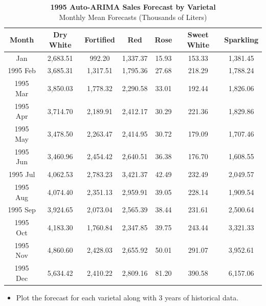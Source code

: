 \documentclass[
  letterpaper,
  DIV=11,
  numbers=noendperiod]{scrartcl}
\providecommand{\tightlist}{%
  \setlength{\itemsep}{0pt}\setlength{\parskip}{0pt}}
\begin{document}
\begin{table}
\caption*{
{\fontsize{20}{25}\selectfont  \textbf{1995 Auto-ARIMA Sales Forecast by Varietal}\fontsize{12}{15}\selectfont } \\ 
{\fontsize{14}{17}\selectfont  Monthly Mean Forecasts (Thousands of Liters)\fontsize{12}{15}\selectfont }
} 
\fontsize{12.0pt}{14.0pt}\selectfont
\begin{tabular*}{1\linewidth}{@{\extracolsep{\fill}}ccccccc}
\toprule
Month & Dry White & Fortified & Red & Rose & Sweet White & Sparkling \\ 
\midrule\addlinespace[2.5pt]
1995 Jan & 2,683.51 & 992.20 & 1,337.37 & 15.93 & 153.33 & 1,381.45 \\ 
1995 Feb & 3,685.31 & 1,317.51 & 1,795.36 & 27.68 & 218.29 & 1,788.24 \\ 
1995 Mar & 3,850.03 & 1,778.32 & 2,290.58 & 33.01 & 192.44 & 1,826.06 \\ 
1995 Apr & 3,714.70 & 2,189.91 & 2,412.17 & 30.29 & 221.36 & 1,829.86 \\ 
1995 May & 3,478.50 & 2,263.47 & 2,414.95 & 30.72 & 179.09 & 1,707.46 \\ 
1995 Jun & 3,460.96 & 2,454.42 & 2,640.51 & 36.38 & 176.70 & 1,608.55 \\ 
1995 Jul & 4,062.53 & 2,783.23 & 3,421.37 & 42.49 & 232.49 & 2,049.57 \\ 
1995 Aug & 4,074.40 & 2,351.13 & 2,959.91 & 39.05 & 228.14 & 1,909.54 \\ 
1995 Sep & 3,924.65 & 2,073.04 & 2,565.39 & 38.44 & 231.61 & 2,500.64 \\ 
1995 Oct & 4,183.30 & 1,760.84 & 2,347.85 & 39.75 & 243.44 & 3,321.33 \\ 
1995 Nov & 4,860.60 & 2,428.03 & 2,655.92 & 50.01 & 291.07 & 3,952.61 \\ 
1995 Dec & 5,634.42 & 2,410.22 & 2,809.16 & 81.20 & 390.58 & 6,157.06 \\ 
\bottomrule
\end{tabular*}
\end{table}

\newpage

\begin{itemize}
\tightlist
\item
  Plot the forecast for each varietal along with 3 years of historical
  data.
\end{itemize}
\end{document}
